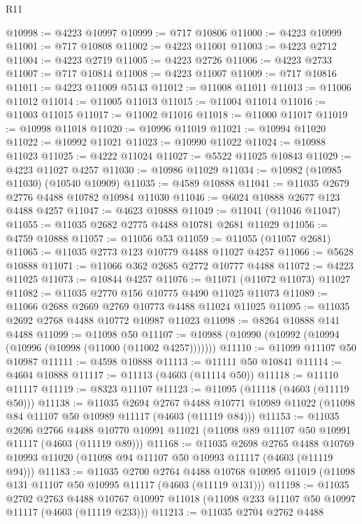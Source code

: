 \begin{lexlean}{R11}
\begin{coremodule}
@10998 := @4223 @10997
@10999 := @717 @10806
@11000 := @4223 @10999
@11001 := @717 @10808
@11002 := @4223 @11001
@11003 := @4223 @2712
@11004 := @4223 @2719
@11005 := @4223 @2726
@11006 := @4223 @2733
@11007 := @717 @10814
@11008 := @4223 @11007
@11009 := @717 @10816
@11011 := @4223 @11009 @5143
@11012 := @11008 @11011
@11013 := @11006 @11012
@11014 := @11005 @11013
@11015 := @11004 @11014
@11016 := @11003 @11015
@11017 := @11002 @11016
@11018 := @11000 @11017
@11019 := @10998 @11018
@11020 := @10996 @11019
@11021 := @10994 @11020
@11022 := @10992 @11021
@11023 := @10990 @11022
@11024 := @10988 @11023
@11025 := @4222 @11024
@11027 := @5522 @11025 @10843
@11029 := @4223 @11027 @4257
@11030 := @10986 @11029
@11034 := @10982 (@10985 @11030) (@10540 @10909)
@11035 := @4589 @10888
@11041 := @11035 @2679 @2776 @4488 @10782 @10984 @11030
@11046 := @6024 @10888 @2677 @123 @4488 @4257
@11047 := @4623 @10888
@11049 := @11041 (@11046 @11047)
@11055 := @11035 @2682 @2775 @4488 @10781 @2681 @11029
@11056 := @4759 @10888
@11057 := @11056 @53
@11059 := @11055 (@11057 @2681)
@11065 := @11035 @2773 @123 @10779 @4488 @11027 @4257
@11066 := @5628 @10888
@11071 := @11066 @362 @2685 @2772 @10777 @4488
@11072 := @4223 @11025
@11073 := @10844 @4257
@11076 := @11071 (@11072 @11073) @11027
@11082 := @11035 @2770 @156 @10775 @4490 @11025 @11073
@11089 := @11066 @2688 @2669 @2769 @10773 @4488 @11024 @11025
@11095 := @11035 @2692 @2768 @4488 @10772 @10987 @11023
@11098 := @8264 @10888 @141 @4488
@11099 := @11098 @50
@11107 := @10988 (@10990 (@10992 (@10994 (@10996 (@10998 (@11000 (@11002 @4257)))))))
@11110 := @11099 @11107 @50 @10987
@11111 := @4598 @10888
@11113 := @11111 @50 @10841
@11114 := @4604 @10888
@11117 := @11113 (@4603 (@11114 @50))
@11118 := @11110 @11117
@11119 := @8323 @11107
@11123 := @11095 (@11118 (@4603 (@11119 @50)))
@11138 := @11035
    @2694
    @2767
    @4488
    @10771
    @10989
    @11022
    (@11098 @84 @11107 @50 @10989 @11117 (@4603 (@11119 @84)))
@11153 := @11035
    @2696
    @2766
    @4488
    @10770
    @10991
    @11021
    (@11098 @89 @11107 @50 @10991 @11117 (@4603 (@11119 @89)))
@11168 := @11035
    @2698
    @2765
    @4488
    @10769
    @10993
    @11020
    (@11098 @94 @11107 @50 @10993 @11117 (@4603 (@11119 @94)))
@11183 := @11035
    @2700
    @2764
    @4488
    @10768
    @10995
    @11019
    (@11098 @131 @11107 @50 @10995 @11117 (@4603 (@11119 @131)))
@11198 := @11035
    @2702
    @2763
    @4488
    @10767
    @10997
    @11018
    (@11098 @233 @11107 @50 @10997 @11117 (@4603 (@11119 @233)))
@11213 := @11035
    @2704
    @2762
    @4488

\end{coremodule}
\end{lexlean}
